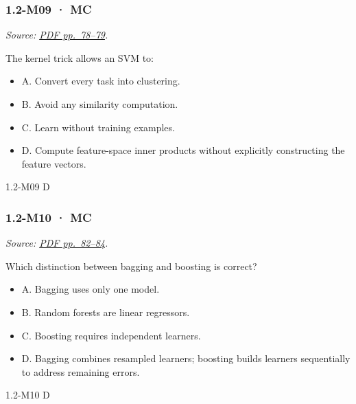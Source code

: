 \noindent\begin{minipage}{\linewidth}

\subsubsection{1.2-M09 · MC}\label{m09-mc-1}

\emph{Source:
\href{../Lecture\%20Slides/1.2.\%20Shallow\%20Learning.pdf\#page=78}{PDF
pp.~78--79}.}

The kernel trick allows an SVM to:

\begin{itemize}
\tightlist
\item
  A. Convert every task into clustering.
\item
  B. Avoid any similarity computation.
\item
  C. Learn without training examples.
\item
  D. Compute feature-space inner products without explicitly
  constructing the feature vectors.
\end{itemize}

\begin{solution}[8mm]{1.2-M09}
D
\end{solution}
\end{minipage}\par\medskip

\noindent\begin{minipage}{\linewidth}

\subsubsection{1.2-M10 · MC}\label{m10-mc-1}

\emph{Source:
\href{../Lecture\%20Slides/1.2.\%20Shallow\%20Learning.pdf\#page=82}{PDF
pp.~82--84}.}

Which distinction between bagging and boosting is correct?

\begin{itemize}
\tightlist
\item
  A. Bagging uses only one model.
\item
  B. Random forests are linear regressors.
\item
  C. Boosting requires independent learners.
\item
  D. Bagging combines resampled learners; boosting builds learners
  sequentially to address remaining errors.
\end{itemize}

\begin{solution}[8mm]{1.2-M10}
D
\end{solution}
\end{minipage}\par\medskip

